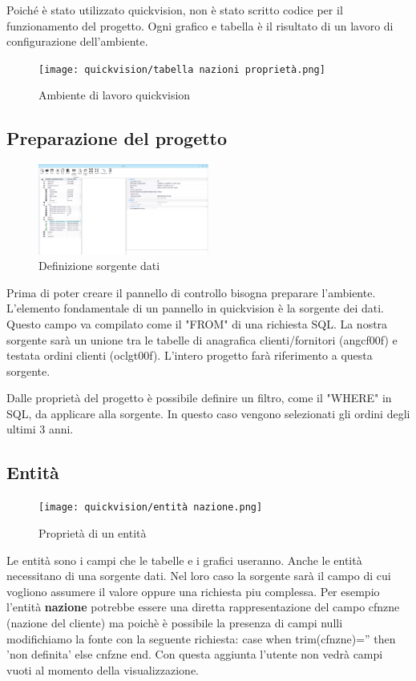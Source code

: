 \documentclass[target=bach,aauheader=,style=]{thud}
\begin{document}
Poiché è stato utilizzato quickvision, non è stato scritto codice per il funzionamento del progetto.
Ogni grafico e tabella è il risultato di un lavoro di configurazione dell'ambiente.

\begin{figure}[H]
    \centering
    \texttt{[image: quickvision/tabella nazioni proprietà.png]}
    \caption{Ambiente di lavoro quickvision}
\end{figure}

\subsection{Preparazione del progetto}

\begin{figure}
    \centering
    \includegraphics[width=0.5\textwidth, trim=26cm 13cm 0cm 4cm, clip]{quickvision/pannello di configurazione progetto.png}
    \caption{Definizione sorgente dati}
\end{figure}

Prima di poter creare il pannello di controllo bisogna preparare l'ambiente.
L'elemento fondamentale di un pannello in quickvision è la sorgente dei dati.
Questo campo va compilato come il "FROM" di una richiesta SQL.
La nostra sorgente sarà un unione tra le tabelle di anagrafica clienti/fornitori (angcf00f) e testata ordini clienti (oclgt00f).
L'intero progetto farà riferimento a questa sorgente.

Dalle proprietà del progetto è possibile definire un filtro, come il "WHERE" in SQL, da applicare alla sorgente. 
In questo caso vengono selezionati gli ordini degli ultimi 3 anni.
\newpage
\subsection{Entità}

\begin{figure}
    \centering
    \texttt{[image: quickvision/entità nazione.png]}
    \caption{Proprietà di un entità}
\end{figure}
Le entità sono i campi che le tabelle e i grafici useranno.
Anche le entità necessitano di una sorgente dati. Nel loro caso la sorgente sarà il campo di cui vogliono assumere il valore oppure una richiesta piu complessa.
Per esempio l'entità \textbf{nazione} potrebbe essere una diretta rappresentazione del campo cfnzne (nazione del cliente) ma poichè è possibile la presenza di campi nulli modifichiamo la fonte con la seguente richiesta:
case when trim(cfnzne)='' then 'non definita' else cnfzne end.
Con questa aggiunta l'utente non vedrà campi vuoti al momento della visualizzazione.
\end{document}
